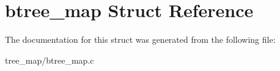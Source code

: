 \hypertarget{structbtree__map}{}\section{btree\+\_\+map Struct Reference}
\label{structbtree__map}


The documentation for this struct was generated from the following file\+:\begin{DoxyCompactItemize}
\item 
tree\+\_\+map/btree\+\_\+map.\+c\end{DoxyCompactItemize}
